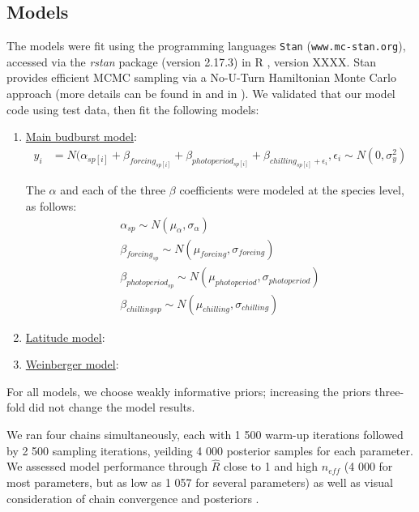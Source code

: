 \documentclass{article}
\begin{document}
\subsection*{Models}

\par The models were fit using the programming languages \texttt{Stan} \citep{Carpenter:2016aa}(\texttt{www.mc-stan.org}), accessed via the \textit{rstan} package (version 2.17.3) in R \citep{Rcore:2017,rstan2018}, version XXXX. Stan provides efficient MCMC sampling via a No-U-Turn Hamiltonian Monte Carlo approach (more details can be found in \citet{BDA} and in \citet{Carpenter:2016aa}). We validated that our model code using test data, then fit the following models:
\begin{enumerate}
\item \underline{Main budburst model}:
\begin{align*}
y_i &= N(\alpha_{sp[i]} + \beta_{forcing_{sp[i]}} + \beta_{photoperiod_{sp[i]}} + \beta_{chilling_{sp[i]} + \epsilon_i}, \epsilon_i \sim N(0,\sigma^2_y)
\end{align*}


\noindent The $\alpha$ and each of the three $\beta$ coefficients were modeled at the species level, as follows:
\begin{align*}
\alpha_{sp} \sim N(\mu_{\alpha}, \sigma_{\alpha}) \\
\beta_{forcing_{sp}} \sim N(\mu_{forcing}, \sigma_{forcing}) \\
\beta_{photoperiod_{sp}} \sim N(\mu_{photoperiod}, \sigma_{photoperiod})\\
\beta_{chilling{sp}} \sim N(\mu_{chilling}, \sigma_{chilling})
\end{align*}

\item \underline{Latitude model}:

\item \underline{Weinberger  model}:

\end{enumerate}

\noindent For all models, we choose weakly informative priors; increasing the priors three-fold did not change the model results. 

We ran four chains simultaneously, each with 1 500 warm-up iterations followed by 2 500 sampling iterations, yeilding 4 000 posterior samples for each parameter. We assessed model performance through $\hat{R}$ close to 1 and high $n_{eff}$ (4 000 for most parameters, but as low as 1 057 for several parameters) as well as visual consideration of chain convergence and posteriors \citep{BDA}. 
\end{document}
